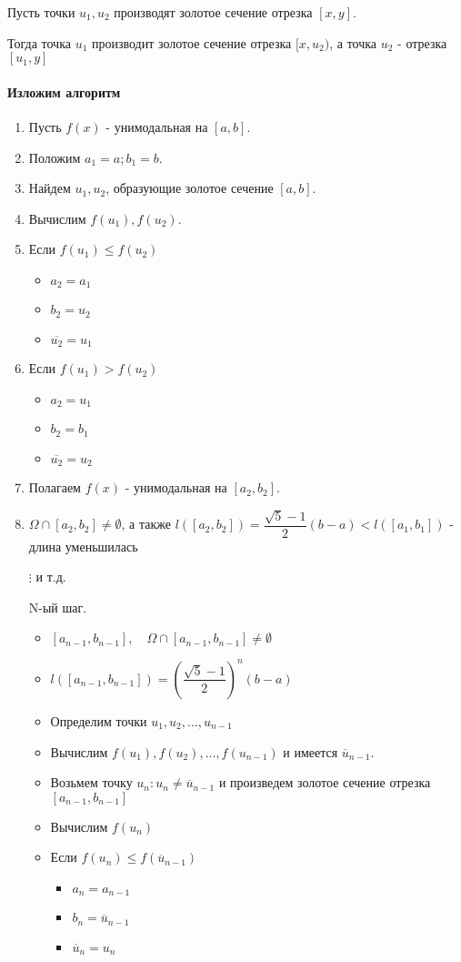 	\begin{utv}
		Пусть точки $u_1, u_2$ производят золотое сечение отрезка $\left[x, y\right]$.
		
		Тогда точка $u_1$ производит золотое сечение отрезка $[x, u_2)$, а точка $u_2$ - отрезка $[u_1,y]$
	\end{utv}
	\paragraph{Изложим алгоритм}
	\begin{enumerate}
		\item Пусть $f(x)$ - унимодальная на $[a, b]$.
		\item Положим $a_1=a; b_1=b$. 
		\item Найдем $u_1, u_2$, образующие золотое сечение $[a, b]$. 
		\item Вычислим $f(u_1), f(u_2)$.
		\item Если $f(u_1) \leq f(u_2)$
		\begin{itemize}
			\item $a_2 = a_1$
			\item $b_2 = u_2$
			\item $\overline{u_2}=u_1$
		\end{itemize}
		\item Если $f(u_1) > f(u_2)$
		\begin{itemize}
			\item $a_2 = u_1$
			\item $b_2 = b_1$
			\item $\overline{u_2} = u_2$
		\end{itemize}
		\item Полагаем $f(x)$ - унимодальная на $[a_2, b_2]$.
		\item $\Omega \cap [a_2, b_2] \neq \emptyset$, а также $l([a_2, b_2])=\dfrac{\sqrt{5}-1}{2}(b-a)<l([a_1, b_1])$ - длина уменьшилась
		\item[$\vdots$] и т.д.
		\item[N-ый шаг.]
	\begin{itemize}
		\item $[a_{n-1}, b_{n-1}], \quad \Omega \cap [a_{n-1}, b_{n-1}] \neq \emptyset$
		\item $l([a_{n-1}, b_{n-1}]) = \left(\dfrac{\sqrt{5}-1}{2}\right)^n(b-a)$
		\item Определим точки $u_1, u_2,\dots,u_{n-1}$
		\item Вычислим $f(u_1), f(u_2),\dots,f(u_{n-1})$ и имеется $\overline{u}_{n-1}$.
		\item Возьмем точку $u_n: u_n\neq \overline{u}_{n-1}$ и произведем золотое сечение отрезка $[a_{n-1}, b_{n-1}]$
		\item Вычислим $f(u_n)$
		\item Если $f(u_n)\leq f(\overline{u}_{n-1})$
		\begin{itemize}
			\item $a_n=a_{n-1}$
			\item $b_n = \overline{u}_{n-1}$
			\item $\overline{u}_n=u_n$
		\end{itemize}
		

\end{itemize}
\end{enumerate}

